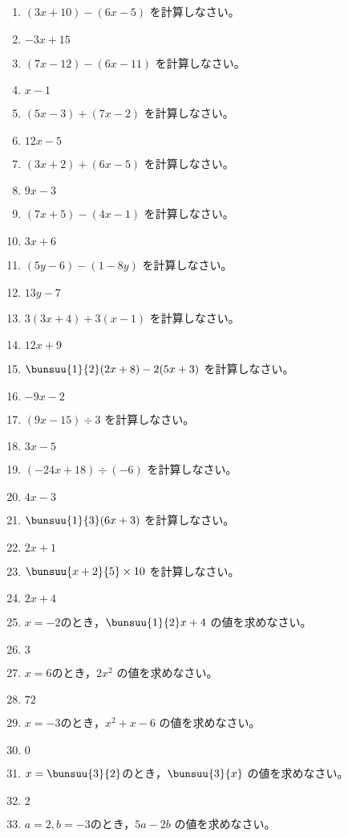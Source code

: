 \documentclass[uplatex,a4j,11pt]{jsreport}
\begin{document}
\begin{multicols}{2}
\begin{enumerate}
    \item $(3x+10)-(6x-5)$ を計算しなさい。%
    \item $-3x+15$
    \item $(7x-12)-(6x-11)$ を計算しなさい。%
    \item $x-1$
    \item $(5x-3)+(7x-2)$ を計算しなさい。%
    \item $12x-5$
    \item $(3x+2)+(6x-5)$ を計算しなさい。%
    \item $9x-3$
    \item $(7x+5)-(4x-1)$ を計算しなさい。%
    \item $3x+6$
    \item $(5y-6)-(1-8y)$ を計算しなさい。%
    \item $13y-7$
    \item $3(3x+4)+3(x-1)$ を計算しなさい。%
    \item $12x+9$
    \item $\bunsuu{1}{2}(2x+8)-2(5x+3)$ を計算しなさい。%
    \item $-9x-2$
    \item $(9x-15)\div3$ を計算しなさい。%
    \item $3x-5$
    \item $(-24x+18)\div(-6)$ を計算しなさい。%
    \item $4x-3$
    \item $\bunsuu{1}{3}(6x+3)$ を計算しなさい。%
    \item $2x+1$
    \item $\bunsuu{x+2}{5}\times10$ を計算しなさい。%
    \item $2x+4$
    \item $x=-2$のとき，$\bunsuu{1}{2}x+4$ の値を求めなさい。%
    \item $3$
    \item $x=6$のとき，$2x^2$ の値を求めなさい。%
    \item $72$
    \item $x=-3$のとき，$x^2+x-6$ の値を求めなさい。%
    \item $0$
    \item $x=\bunsuu{3}{2}$のとき，$\bunsuu{3}{x}$ の値を求めなさい。%
    \item $2$
    \item $a=2,b=-3$のとき，$5a-2b$ の値を求めなさい。%

\end{enumerate}
\end{multicols}
\end{document}
